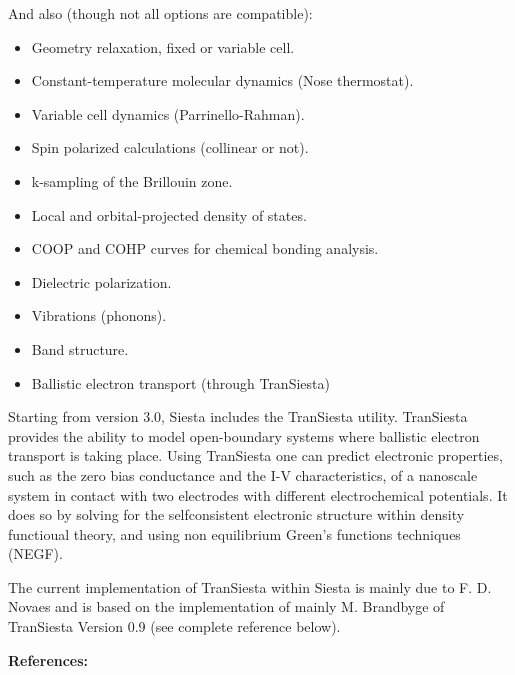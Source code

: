 \documentclass[11pt]{article}
\begin{document}
And also (though not all options are compatible):
\begin{itemize}
\item Geometry relaxation, fixed or variable cell.
\item Constant-temperature molecular dynamics (Nose thermostat).
\item Variable cell dynamics (Parrinello-Rahman).
\item Spin polarized calculations (collinear or not).
\item k-sampling of the Brillouin zone.
\item Local and orbital-projected density of states.
\item COOP and COHP curves for chemical bonding analysis.
\item Dielectric polarization.
\item Vibrations (phonons).
\item Band structure.
\item Ballistic electron transport (through {\sc TranSiesta})
\end{itemize}


Starting from version 3.0, {\sc Siesta} includes the {\sc
  TranSiesta} utility.  {\sc
  TranSiesta} provides the ability to model open-boundary systems
where ballistic electron transport is taking place.  Using {\sc
  TranSiesta} one can predict electronic properties, such as the zero
bias conductance and the I-V characteristics, of a nanoscale system in
contact with two electrodes with different electrochemical potentials.
It does so by solving for the selfconsistent electronic structure
within density functioual theory, and using non equilibrium Green's
functions techniques (NEGF).

The current implementation of {\sc TranSiesta} within {\sc Siesta} is mainly 
due to F. D. Novaes and is based on the implementation of 
mainly M. Brandbyge of {\sc TranSiesta} Version 0.9 (see 
complete reference below). 


\vspace{0.5cm}
{\large {\bf References:} }
\end{document}
